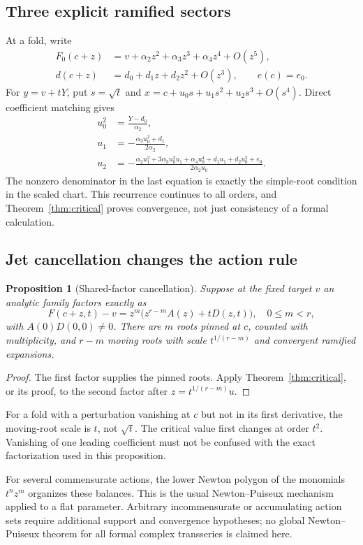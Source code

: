 \documentclass[11pt,a4paper]{article}
\numberwithin{equation}{section}
\newtheorem{proposition}[theorem]{Proposition}
\theoremstyle{definition}
\theoremstyle{remark}\newtheorem{remark}[theorem]{Remark}
\begin{document}
\subsection{Three explicit ramified sectors}
At a fold, write
\begin{align*}
 F_0(c+z)&=v+\alpha_2 z^2+\alpha_3z^3+\alpha_4z^4+O(z^5),\\
 d(c+z)&=d_0+d_1z+d_2z^2+O(z^3),\qquad e(c)=e_0.
\end{align*}
For $y=v+tY$, put $s=\sqrt t$ and
$x=c+u_0s+u_1s^2+u_2s^3+O(s^4)$. Direct coefficient matching gives
\begin{align}
 u_0^2&=\frac{Y-d_0}{\alpha_2},\label{eq:u0}\\
 u_1&=-\frac{\alpha_3u_0^2+d_1}{2\alpha_2},\label{eq:u1}\\
 u_2&=-\frac{\alpha_2u_1^2+3\alpha_3u_0^2u_1+\alpha_4u_0^4
                +d_1u_1+d_2u_0^2+e_0}{2\alpha_2u_0}.
       \label{eq:u2}
\end{align}
The nonzero denominator in the last equation is exactly the simple-root
condition in the scaled chart. This recurrence continues to all orders,
and Theorem~\ref{thm:critical} proves convergence, not just consistency
of a formal calculation.

\subsection{Jet cancellation changes the action rule}
\begin{proposition}[Shared-factor cancellation]\label{prop:jet}
Suppose at the fixed target $v$ an analytic family factors exactly as
\[
 F(c+z,t)-v=z^m\bigl(z^{r-m}A(z)+tD(z,t)\bigr),
 \quad 0\le m<r,
\]
with $A(0)D(0,0)\ne0$. There are $m$ roots pinned at $c$, counted with
multiplicity, and $r-m$ moving roots with scale $t^{1/(r-m)}$ and
convergent ramified expansions.
\end{proposition}
\begin{proof}
The first factor supplies the pinned roots. Apply
Theorem~\ref{thm:critical}, or its proof, to the second factor after
$z=t^{1/(r-m)}u$.
\end{proof}
For a fold with a perturbation vanishing at $c$ but not in its first
derivative, the moving-root scale is $t$, not $\sqrt t$. The critical
value first changes at order $t^2$. Vanishing of one leading coefficient
must not be confused with the exact factorization used in this proposition.

For several commensurate actions, the lower Newton polygon of the
monomials $t^n z^m$ organizes these balances. This is the usual
Newton--Puiseux mechanism applied to a flat parameter. Arbitrary
incommensurate or accumulating action sets require additional support
and convergence hypotheses; no global Newton--Puiseux theorem for all
formal complex transseries is claimed here.
\end{document}
